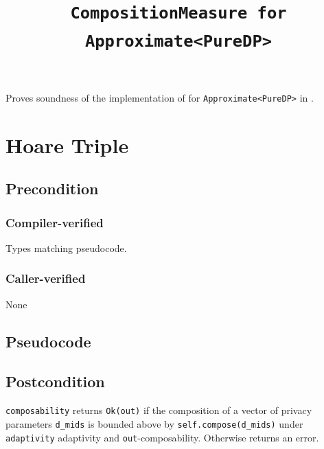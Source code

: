 \documentclass{article}
\title{\texttt{CompositionMeasure for Approximate<PureDP>}}
\author{\MichaelShoemateAuthor}
\date{}
\begin{document}
\maketitle

\contrib
Proves soundness of the implementation of  
for \texttt{Approximate<PureDP>} in .

\section{Hoare Triple}
\subsection*{Precondition}
\subsubsection*{Compiler-verified}
Types matching pseudocode.


\subsubsection*{Caller-verified}
None

\subsection*{Pseudocode}


\subsection*{Postcondition}
\begin{theorem}
  \texttt{composability} returns \texttt{Ok(out)} if the composition of a vector of privacy parameters \texttt{d\_mids} 
  is bounded above by \texttt{self.compose(d\_mids)} under \texttt{adaptivity} adaptivity and \texttt{out}-composability.
  Otherwise returns an error.
\end{theorem}
\end{document}
